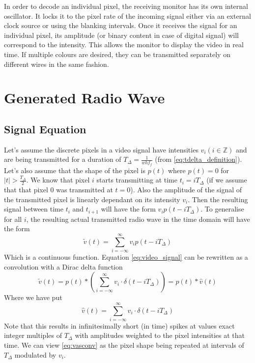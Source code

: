 \documentclass[a4paper,12pt,twoside,openright]{report}
\begin{document}
In order to decode an individual pixel, the receiving monitor has its own internal oscillator. It locks it to the pixel rate of the incoming signal either via an external clock source or using the blanking intervals. Once it receives the signal for an individual pixel, its amplitude (or binary content in case of digital signal) will correspond to the intensity. This allows the monitor to display the video in real time. If multiple colours are desired, they can be transmitted separately on different wires in the same fashion.

\section{Generated Radio Wave}

\subsection{Signal Equation}
Let's assume the discrete pixels in a video signal have intensities $v_{i} (i \in \mathbb{Z})$ and are being transmitted for a duration of $T_{\Delta}=\frac{1}{w h f_{f}}$ (from \ref{eq:tdelta_definition}). Let's also assume that the shape of the pixel is $p(t)$ where $p(t)=0$ for $|t| > \frac{T_{\Delta}}{2}$. We know that pixel $i$ starts transmitting at time $t_{i}=i T_{\Delta}$ (if we assume that that pixel 0 was transmitted at $t=0$). Also the amplitude of the signal of the transmitted pixel is linearly dependant on its intensity $v_{i}$. Then the resulting signal between time $t_{i}$ and $t_{i+1}$ will have the form $v_{i} p(t-i T_{\Delta})$. To generalise for all $i$, the resulting actual transmitted radio wave in the time domain will have the form 
\begin{equation}
\label{eq:video_signal}
\tilde{v}(t) = \sum\limits_{i=-\infty}^{\infty} v_{i} p(t-i T_{\Delta})
\end{equation}
Which is a continuous function. Equation \ref{eq:video_signal} can be rewritten as a convolution with a Dirac delta function
\begin{equation}
\label{eq:vasconv}
\tilde{v}(t) = p(t) \ast \left( \sum\limits_{i=-\infty}^{\infty} v_{i} \cdot \delta(t-i T_{\Delta}) \right) = p(t) \ast \hat{v}(t)
\end{equation}
Where we have put
\begin{equation}
\label{eq:vhattdef}
\hat{v}(t) = \sum\limits_{i=-\infty}^{\infty} v_{i} \cdot \delta(t-i T_{\Delta})
\end{equation}
Note that this results in infinitesimally short (in time) spikes at values exact integer multiples of $T_{\Delta}$ with amplitudes weighted to the pixel intensities at that time. We can view \ref{eq:vasconv} as the pixel shape being repeated at intervals of $T_{\Delta}$ modulated by $v_{i}$. 
\end{document}
